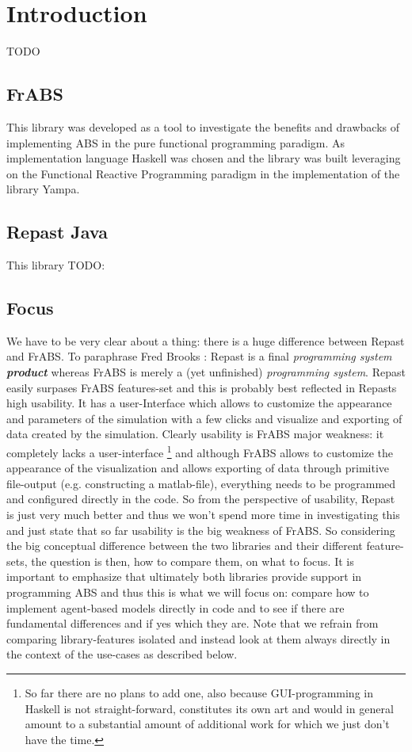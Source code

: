 \chapter{Introduction}

TODO

\section{FrABS}
This library was developed as a tool to investigate the benefits and drawbacks of implementing ABS in the pure functional programming paradigm. As implementation language Haskell was chosen and the library was built leveraging on the Functional Reactive Programming paradigm in the implementation of the library Yampa.

\section{Repast Java}
This library TODO:

\section{Focus}
We have to be very clear about a thing: there is a huge difference between Repast and FrABS. To paraphrase Fred Brooks \cite{jr_mythical_1995}: Repast is a final \textit{programming system \textbf{product}} whereas FrABS is merely a (yet unfinished)  \textit{programming system}. Repast easily surpases FrABS features-set and this is probably best reflected in Repasts high usability. It has a user-Interface which allows to customize the appearance and parameters of the simulation with a few clicks and visualize and exporting of data created by the simulation. Clearly usability is FrABS major weakness: it completely lacks a user-interface \footnote{So far there are no plans to add one, also because GUI-programming in Haskell is not straight-forward, constitutes its own art and would in general amount to a substantial amount of additional work for which we just don't have the time.} and although FrABS allows to customize the appearance of the visualization and allows exporting of data through primitive file-output (e.g. constructing a matlab-file), everything needs to be programmed and configured directly in the code. So from the perspective of usability, Repast is just very much better and thus we won't spend more time in investigating this and just state that so far usability is the big weakness of FrABS.
So considering the big conceptual difference between the two libraries and their different feature-sets, the question is then, how to compare them, on what to focus. It is important to emphasize that ultimately both libraries provide support in programming ABS and thus this is what we will focus on: compare how to implement agent-based models directly in code and to see if there are fundamental differences and if yes which they are. Note that we refrain from comparing library-features isolated and instead look at them always directly in the context of the use-cases as described below.

